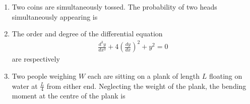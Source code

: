 \documentclass[journal,12pt,onecolumn]{IEEEtran}
\theoremstyle{remark}
\begin{document}
\begin{enumerate}
\begin{enumerate}
\end{enumerate}
\noindent\item Two coins are simultaneously tossed. The probability of two heads simultaneously appearing is \hfill{}
\begin{enumerate}
\end{enumerate}
\noindent\item The order and degree of the differential equation 
\begin{align*}
\frac{d^3 y}{dx^3} + 4 \left( \frac{dy}{dx} \right)^2 + y^2 = 0
\end{align*}
are respectively \hfill{}
\begin{enumerate}
\end{enumerate}
\noindent\item Two people weighing $W$ each are sitting on a plank of length $L$ floating on water at $\frac{L}{4}$ from either end. Neglecting the weight of the plank, the bending moment at the centre of the plank is \hfill{}
\begin{enumerate}

\end{enumerate}
\end{enumerate}
\end{document}
